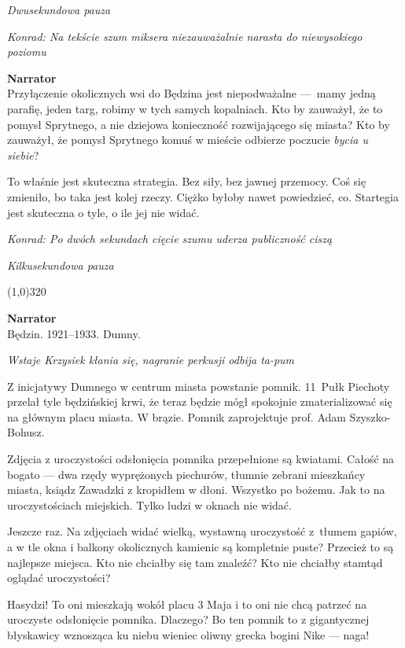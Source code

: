\documentclass[11pt,a4paper,oneside]{article}
\begin{document}
{\color{light-gray} \emph{Dwusekundowa pauza}}

{\color{konrad} \emph{Konrad: Na tekście szum miksera niezauważalnie narasta do niewysokiego poziomu}}

\textbf{Narrator}\\
Przyłączenie okolicznych wsi do Będzina jest niepodważalne \mbox{---}~mamy
jedną parafię, jeden targ, robimy w  tych samych kopalniach. Kto by
zauważył, że to pomysł Sprytnego, a nie dziejowa konieczność
rozwijającego się miasta?  Kto by zauważył, że pomysł Sprytnego komuś
w mieście odbierze poczucie \emph{bycia u siebie}?

To właśnie jest skuteczna strategia. Bez siły, bez jawnej przemocy.
Coś się zmieniło, bo taka jest kolej rzeczy.  Ciężko byłoby nawet
powiedzieć, co. Startegia jest skuteczna o tyle, o ile jej nie widać. 

{\color{konrad} \emph{Konrad: Po dwóch sekundach cięcie szumu uderza publiczność ciszą}}

{\color{light-gray} \emph{Kilkusekundowa pauza}}


\line(1,0){320}

\textbf{Narrator}\\
Będzin. 1921--1933. Dumny. 

{\color{light-gray} \emph{Wstaje Krzysiek kłania się, nagranie
perkusji odbija ta-pum}}

Z inicjatywy Dumnego w centrum miasta powstanie pomnik. 11~Pułk
Piechoty przelał tyle będzińskiej krwi, że teraz będzie mógł spokojnie 
zmaterializować się na głównym placu miasta. W brązie. Pomnik zaprojektuje
prof. Adam Szyszko-Bohusz.

Zdjęcia z uroczystości odsłonięcia pomnika przepełnione są kwiatami.
Całość na bogato --- dwa rzędy wyprężonych piechurów, tłumnie zebrani
mieszkańcy miasta, ksiądz Zawadzki z kropidłem w dłoni.
Wszystko po bożemu.  Jak to na uroczystościach miejskich.
Tylko ludzi w oknach nie widać.

Jeszcze raz. Na zdjęciach widać wielką, wystawną uroczystość z~tłumem
gapiów, a w tle okna i balkony okolicznych kamienic są kompletnie puste? 
Przecież to są najlepsze miejsca. Kto nie chciałby się tam znaleźć?
Kto nie chciałby stamtąd oglądać uroczystości?

Hasydzi! To oni mieszkają wokół placu 3 Maja i to oni nie chcą patrzeć
na uroczyste odsłonięcie pomnika. Dlaczego? Bo ten pomnik to z gigantycznej
błyskawicy wznosząca ku niebu wieniec oliwny grecka bogini Nike --- naga!
\end{document}
